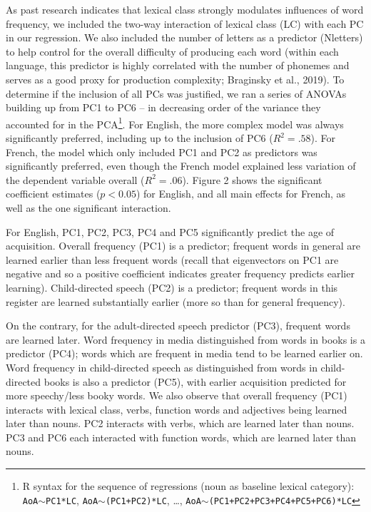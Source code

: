 \documentclass[10pt, letterpaper]{article}
\begin{document}
As past research indicates that lexical class strongly modulates
influences of word frequency, we included the two-way interaction of
lexical class (LC) with each PC in our regression. We also included the
number of letters as a predictor (Nletters) to help control for the
overall difficulty of producing each word (within each language, this
predictor is highly correlated with the number of phonemes and serves as
a good proxy for production complexity; Braginsky et al., 2019). To
determine if the inclusion of all PCs was justified, we ran a series of
ANOVAs building up from PC1 to PC6 -- in decreasing order of the
variance they accounted for in the PCA\footnote{R syntax for the
  sequence of regressions (noun as baseline lexical category):
  \texttt{AoA}\(\sim\)\texttt{PC1*LC},
  \texttt{AoA}\(\sim\)\texttt{(PC1+PC2)*LC}, \ldots,
  \texttt{AoA}\(\sim\)\texttt{(PC1+PC2+PC3+PC4+PC5+PC6)*LC}}. For
English, the more complex model was always significantly preferred,
including up to the inclusion of PC6 (\(R^2 = .58\)). For French, the
model which only included PC1 and PC2 as predictors was significantly
preferred, even though the French model explained less variation of the
dependent variable overall (\(R^2 = .06\)). Figure 2 shows the
significant coefficient estimates (\(p<0.05\)) for English, and all main
effects for French, as well as the one significant interaction.

For English, PC1, PC2, PC3, PC4 and PC5 significantly predict the age of
acquisition. Overall frequency (PC1) is a predictor; frequent words in
general are learned earlier than less frequent words (recall that
eigenvectors on PC1 are negative and so a positive coefficient indicates
greater frequency predicts earlier learning). Child-directed speech
(PC2) is a predictor; frequent words in this register are learned
substantially earlier (more so than for general frequency).

On the contrary, for the adult-directed speech predictor (PC3), frequent
words are learned later. Word frequency in media distinguished from
words in books is a predictor (PC4); words which are frequent in media
tend to be learned earlier on. Word frequency in child-directed speech
as distinguished from words in child-directed books is also a predictor
(PC5), with earlier acquisition predicted for more speechy/less booky
words. We also observe that overall frequency (PC1) interacts with
lexical class, verbs, function words and adjectives being learned later
than nouns. PC2 interacts with verbs, which are learned later than
nouns. PC3 and PC6 each interacted with function words, which are
learned later than nouns.
\end{document}
